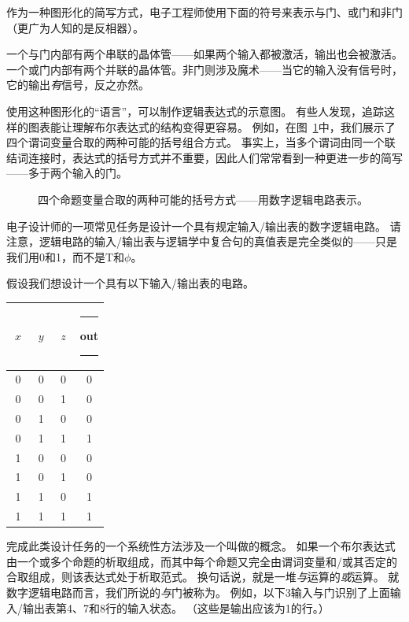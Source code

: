 \newpage

作为一种图形化的简写方式，电子工程师使用下面的符号来表示与门、或门和非门（更广为人知的是反相器）。

\begin{center}

\end{center}

一个与门内部有两个串联的晶体管——如果两个输入都被激活，输出也会被激活。
一个或门内部有两个并联的晶体管。非门则涉及魔术——当它的输入没有信号时，它的输出\emph{有}信号，反之亦然。

使用这种图形化的“语言”，可以制作逻辑表达式的示意图。
有些人发现，追踪这样的图表能让理解布尔表达式的结构变得更容易。
例如，在图~\ref{fig:3ands}中，我们展示了四个谓词变量合取的两种可能的括号组合方式。
事实上，当多个谓词由同一个联结词连接时，表达式的括号方式并不重要，因此人们常常看到一种更进一步的简写——多于两个输入的门。

\begin{figure}[!hbtp] 
\centerline{}
\caption[用数字逻辑电路表示括号方式]{四个命题变量合取的两种可能的括号方式——用数字逻辑电路表示。}
\label{fig:3ands}
\end{figure}

电子设计师的一项常见任务是设计一个具有规定输入/输出表的数字逻辑电路。
请注意，逻辑电路的输入/输出表与逻辑学中复合句的真值表是完全类似的——只是我们用0和1，而不是T和$\phi$。

假设我们想设计一个具有以下输入/输出表的电路。

\begin{center}
\begin{tabular}{c|c|c|c}
$\; x \;$ & $\; y \;$ & $\; z \;$ & \rule{5pt}{0pt} out \rule{5pt}{0pt} \\ \hline
0 & 0 & 0 & 0 \\
0 & 0 & 1 & 0 \\
0 & 1 & 0 & 0 \\
0 & 1 & 1 & 1 \\ \hline
1 & 0 & 0 & 0 \\ 
1 & 0 & 1 & 0 \\ 
1 & 1 & 0 & 1 \\ 
1 & 1 & 1 & 1 \\
\end{tabular}
\end{center}


完成此类设计任务的一个系统性方法涉及一个叫做的概念。
如果一个布尔表达式由一个或多个命题的析取组成，而其中每个命题又完全由谓词变量和/或其否定的合取组成，则该表达式处于析取范式。
换句话说，就是一堆{\em 与}运算的{\em 或}运算。
就数字逻辑电路而言，我们所说的{\em 与}门被称为。
例如，以下3输入与门识别了上面输入/输出表第4、7和8行的输入状态。
（这些是输出应该为1的行。）

